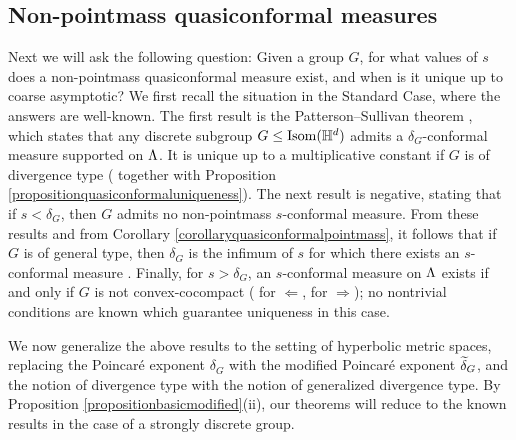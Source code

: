 \subsection{Non-pointmass quasiconformal measures}
Next we will ask the following question: Given a group $G$, for what values of $s$ does a non-pointmass quasiconformal measure exist, and when is it unique up to coarse asymptotic? We first recall the situation in the Standard Case, where the answers are well-known. The first result is the Patterson--Sullivan theorem \cite[Theorem 1]{Sullivan_density_at_infinity}, which states that any discrete subgroup $G\leq\Isom(\H^d)$ admits a $\delta_G$-conformal measure supported on $\Lambda$. It is unique up to a multiplicative constant if $G$ is of divergence type (\cite[Theorem 8.3.5]{Nicholls} together with Proposition \ref{propositionquasiconformaluniqueness}). The next result is negative, stating that if $s < \delta_G$, then $G$ admits no non-pointmass $s$-conformal measure. From these results and from Corollary \ref{corollaryquasiconformalpointmass}, it follows that if $G$ is of general type, then $\delta_G$ is the infimum of $s$ for which there exists an $s$-conformal measure \cite[Corollary 4]{Sullivan_density_at_infinity}. Finally, for $s > \delta_G$, an $s$-conformal measure on $\Lambda$ exists if and only if $G$ is not convex-cocompact (\cite[Theorem 4.1]{AFT} for $\Leftarrow$, \cite[Theorem 4.4.1]{Nicholls} for $\Rightarrow$); no nontrivial conditions are known which guarantee uniqueness in this case.

We now generalize the above results to the setting of hyperbolic metric spaces, replacing the Poincar\'e exponent $\delta_G$ with the modified Poincar\'e exponent $\widetilde\delta_G$, and the notion of divergence type with the notion of generalized divergence type. By Proposition \ref{propositionbasicmodified}(ii), our theorems will reduce to the known results in the case of a strongly discrete group.

